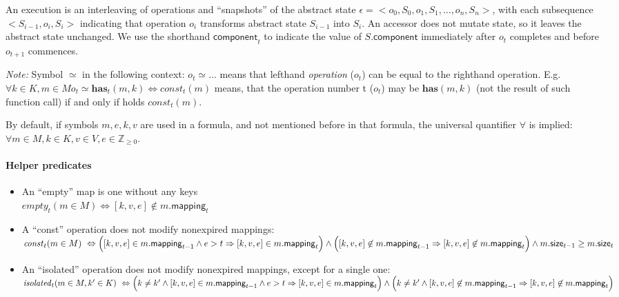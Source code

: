 \documentclass{article}
\renewcommand{\o}[1]{\ensuremath{\mathbf{#1}}}
\newcommand{\p}[1]{\ensuremath{\mathit{#1}}}
\newcommand{\s}[1]{\ensuremath{\mathsf{#1}}}
\newcommand{\nintset}{\ensuremath{\mathds{Z}_{\ge 0}}}
\begin{document}
An execution is an interleaving of operations and ``snapshots'' of the abstract state
$\epsilon = <o_0, S_0, o_1, S_1, ..., o_n, S_n>$, with
each subsequence $<S_{i-1}, o_i, S_i>$ indicating that operation $o_i$ transforms abstract state $S_{i-1}$ into $S_i$.
An accessor does not mutate state, so it leaves the abstract state unchanged.
We use the shorthand $\s{component}_t$ to indicate the value of $S.$\s{component} immediately after $o_t$ completes and before $o_{t+1}$ commences.

{\it Note:} Symbol $\simeq$ in the following context: $o_t\simeq ...$ means that lefthand {\it operation} ($o_t$) can be equal to the righthand operation. E.g. $\forall k \in K, m \in M o_t\simeq \o{has}_t(m, k) \Leftrightarrow \p{const}_t(m)$ means, that the operation number t ($o_t$) may be $\o{has}(m, k)$ (not the result of such function call) if and only if holds $\p{const}_t(m)$.

By default, if symbols $m, e, k, v$ are used in a formula, and not mentioned before in that formula, the universal quantifier $\forall$ is implied: $\forall m\in M, k \in K, v\in V, e\in \nintset$.

\paragraph{Helper predicates}
\begin{itemize}
   \item An ``empty'' map is one without any keys \\
            $\p{empty}_t(m\in M) \Leftrightarrow [k, v, e] \not\in m.\s{mapping}_t$
   \item A ``const'' operation does not modify nonexpired mappings:\\
     $\p{const}_t(m\in M) ~\Leftrightarrow~\\ \Big([k, v, e] \in m.\s{mapping}_{t-1} \wedge e>t \Rightarrow [k, v, e] \in m.\s{mapping}_t\Big)\wedge\\ \Big([k, v, e] \not\in m.\s{mapping}_{t-1} \Rightarrow [k, v, e] \not\in m.\s{mapping}_t\Big)\wedge m.\s{size}_{t-1} \ge m.\s{size}_t$
   \item An ``isolated'' operation does not modify nonexpired mappings, except for a single one:\\
     $\p{isolated}_t(m\in M, k'\in K) ~\Leftrightarrow~\\ \Big(k\neq k' \wedge [k, v, e] \in m.\s{mapping}_{t-1} \wedge e>t \Rightarrow [k, v, e] \in m.\s{mapping}_t\Big)\wedge\\ \Big(k\neq k' \wedge [k, v, e] \not\in m.\s{mapping}_{t-1} \Rightarrow [k, v, e] \not\in m.\s{mapping}_t\Big)$
   
\end{itemize}
\end{document}
